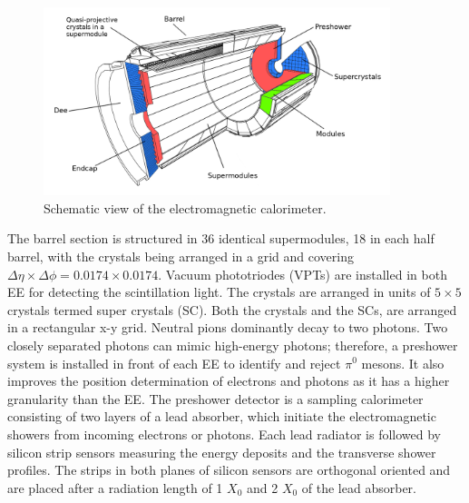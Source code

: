 \begin{figure}[htbp]
  \centering
  \includegraphics[width=0.9\textwidth]{plots/chapter3/ecal.png}
  \caption{Schematic view of the electromagnetic calorimeter.}
  \label{fig:ecal}
\end{figure}

The barrel section is structured in 36 identical supermodules, 18 in each half barrel, with the crystals being arranged in a grid and covering $\Delta \eta \times \Delta \phi=0.0174 \times 0.0174$. Vacuum phototriodes (VPTs) are installed in both EE for detecting the scintillation light. The crystals are arranged in units of $5 \times 5$ crystals termed super crystals (SC). Both the crystals and the SCs, are arranged in a rectangular x-y grid. Neutral pions dominantly decay to two photons. Two closely separated photons can mimic high-energy photons; therefore, a preshower system is installed in front of each EE to identify and reject $\pi^0$ mesons. It also improves the position determination of electrons and photons as it has a higher granularity than the EE. The preshower detector is a sampling calorimeter consisting of two layers of a lead absorber, which initiate the electromagnetic showers from incoming electrons or photons. Each lead radiator is followed by silicon strip sensors measuring the energy deposits and the transverse shower profiles. The strips in both planes of silicon sensors are orthogonal oriented and are placed after a radiation length of 1 $X_0$ and 2 $X_0$ of the lead absorber.

